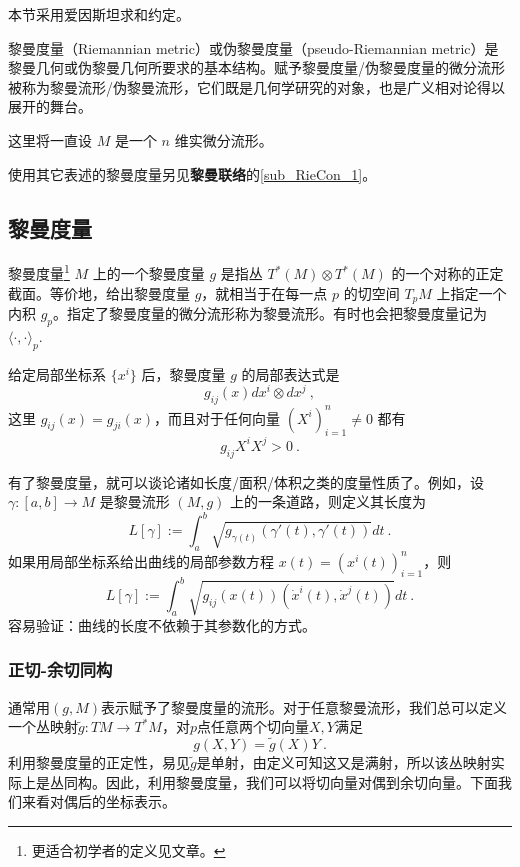 
本节采用爱因斯坦求和约定。

黎曼度量（Riemannian metric）或伪黎曼度量（pseudo-Riemannian metric）是黎曼几何或伪黎曼几何所要求的基本结构。赋予黎曼度量/伪黎曼度量的微分流形被称为黎曼流形/伪黎曼流形，它们既是几何学研究的对象，也是广义相对论得以展开的舞台。

这里将一直设 $M$ 是一个 $n$ 维实微分流形。

使用其它表述的黎曼度量另见\textbf{黎曼联络}的\autoref{sub_RieCon_1}。

\subsection{黎曼度量}
\begin{definition}{黎曼度量\footnote{更适合初学者的定义见文章。}}
$M$ 上的一个黎曼度量 $g$ 是指丛 $T^*(M)\otimes T^*(M)$ 的一个对称的正定截面。等价地，给出黎曼度量 $g$，就相当于在每一点 $p$ 的切空间 $T_pM$ 上指定一个内积 $g_p$。指定了黎曼度量的微分流形称为黎曼流形。有时也会把黎曼度量记为 $\langle\cdot,\cdot\rangle_p$.
\end{definition}
给定局部坐标系 $\{x^i\}$ 后，黎曼度量 $g$ 的局部表达式是
$$
g_{ij}(x)dx^i\otimes dx^j~,
$$
这里 $g_{ij}(x)=g_{ji}(x)$，而且对于任何向量 $(X^i)_{i=1}^n\neq0$ 都有
$$
g_{ij}X^iX^j>0~.
$$

有了黎曼度量，就可以谈论诸如长度/面积/体积之类的度量性质了。例如，设 $\gamma:[a,b]\to M$ 是黎曼流形 $(M,g)$ 上的一条道路，则定义其长度为
$$
L[\gamma]:=\int_{a}^b \sqrt{g_{\gamma(t)}(\gamma'(t),\gamma'(t))}dt~.
$$
如果用局部坐标系给出曲线的局部参数方程 $x(t)=(x^i(t))_{i=1}^n$，则
$$
L[\gamma]:=\int_{a}^b \sqrt{g_{ij}(x(t))(\dot x^i(t),\dot x^j(t))}dt~.
$$
容易验证：曲线的长度不依赖于其参数化的方式。
\subsubsection{正切-余切同构}
通常用$(g,M)$表示赋予了黎曼度量的流形。对于任意黎曼流形，我们总可以定义一个丛映射$\widetilde g:TM\rightarrow T^*M$，对$p$点任意两个切向量$X,Y$满足
\begin{equation}
g(X,Y)=\widetilde g(X)Y~.
\end{equation}
利用黎曼度量的正定性，易见$\widetilde g$是单射，由定义可知这又是满射，所以该丛映射实际上是丛同构。因此，利用黎曼度量，我们可以将切向量对偶到余切向量。下面我们来看对偶后的坐标表示。

